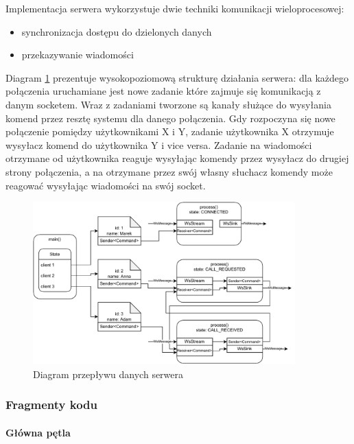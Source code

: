 Implementacja serwera wykorzystuje dwie techniki komunikacji wieloprocesowej:

\begin{itemize}
    \item synchronizacja dostępu do dzielonych danych
    \item przekazywanie wiadomości
\end{itemize}

Diagram \ref{fig:server_data_flow} prezentuje wysokopoziomową strukturę działania serwera: dla
każdego połączenia uruchamiane jest nowe zadanie które zajmuje się komunikacją z danym socketem.
Wraz z zadaniami tworzone są kanały służące do wysyłania komend przez resztę systemu dla danego
połączenia. Gdy rozpoczyna się nowe połączenie pomiędzy użytkownikami X i Y, zadanie użytkownika X
otrzymuje wysyłacz komend do użytkownika Y i vice versa. Zadanie na wiadomości otrzymane od
użytkownika reaguje wysyłając komendy przez wysyłacz do drugiej strony połączenia, a na otrzymane
przez swój własny słuchacz komendy może reagować wysyłając wiadomości na swój socket.

\begin{figure}[H]
    \centering
    \includegraphics[width=0.9\textwidth]{img/implementacja/server_data_flow}
    \caption{Diagram przepływu danych serwera}
    \label{fig:server_data_flow}
\end{figure}

\subsubsection{Fragmenty kodu}

\paragraph{Główna pętla}

